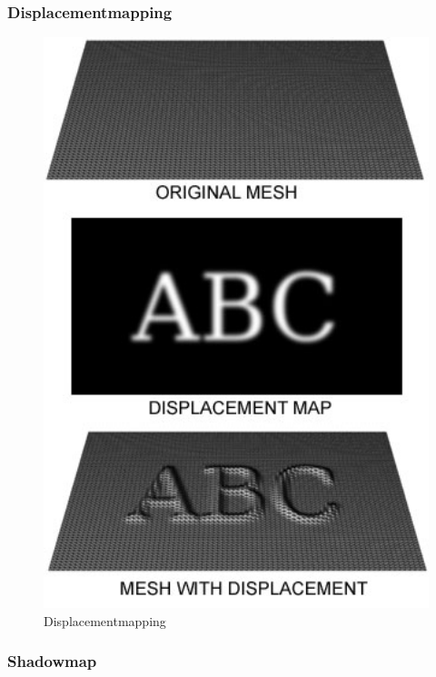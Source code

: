 \subsubsection{Displacementmapping}



\begin{figure}[H]
    \centering
    \includegraphics[width=1.0\textwidth]{images/Displacement.jpg}
    \caption{Displacementmapping} %
    \label{fig:displacement-mapping}
\end{figure}



\subsubsection{Shadowmap}

